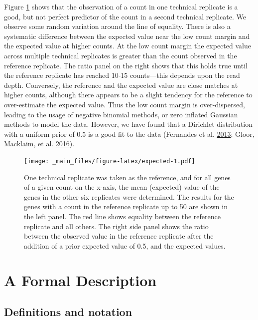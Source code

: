 \documentclass[onecolumn]{book}
\theoremstyle{definition}
\theoremstyle{definition}
\theoremstyle{definition}
\theoremstyle{remark}
\begin{document}
Figure \ref{fig:expected} shows that the observation of a count in one
technical replicate is a good, but not perfect predictor of the count in
a second technical replicate. We observe some random variation around
the line of equality. There is also a systematic difference between the
expected value near the low count margin and the expected value at
higher counts. At the low count margin the expected value across
multiple technical replicates is greater than the count observed in the
reference replicate. The ratio panel on the right shows that this holds
true until the reference replicate has reached 10-15 counts---this
depends upon the read depth. Conversely, the reference and the expected
value are close matches at higher counts, although there appears to be a
slight tendency for the reference to over-estimate the expected value.
Thus the low count margin is over-dispersed, leading to the usage of
negative binomial methods, or zero inflated Gaussian methods to model
the data. However, we have found that a Dirichlet distribution with a
uniform prior of 0.5 is a good fit to the data (Fernandes et al.
\protect\hyperlink{ref-fernandes:2013}{2013}; Gloor, Macklaim, et al.
\protect\hyperlink{ref-gloorAJS:2016}{2016}).

\begin{figure}
\centering
\texttt{[image: \_main\_files/figure-latex/expected-1.pdf]}
\caption{\label{fig:expected}One technical replicate was taken as the
reference, and for all genes of a given count on the x-axis, the mean
(expected) value of the genes in the other six replicates were
determined. The results for the genes with a count in the reference
replicate up to 50 are shown in the left panel. The red line shows
equality between the reference replicate and all others. The right side
panel shows the ratio between the observed value in the reference
replicate after the addition of a prior expected value of 0.5, and the
expected values.}
\end{figure}

\hypertarget{a-formal-description}{%
\section{A Formal Description}\label{a-formal-description}}

\hypertarget{definitions-and-notation}{%
\subsection{Definitions and notation}\label{definitions-and-notation}}
\end{document}
